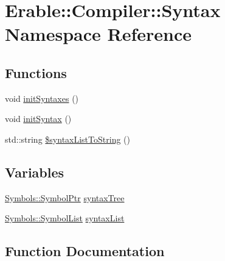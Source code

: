 \hypertarget{namespace_erable_1_1_compiler_1_1_syntax}{}\section{Erable\+::Compiler\+::Syntax Namespace Reference}
\label{namespace_erable_1_1_compiler_1_1_syntax}
\subsection*{Functions}
\begin{DoxyCompactItemize}
\item 
void \mbox{\hyperlink{namespace_erable_1_1_compiler_1_1_syntax_ab106bf5dfac4f663f37aab77e5469398}{init\+Syntaxes}} ()
\item 
void \mbox{\hyperlink{namespace_erable_1_1_compiler_1_1_syntax_a4dde89d8378cb3d9f82ca7f6e125956e}{init\+Syntax}} ()
\item 
std\+::string \mbox{\hyperlink{namespace_erable_1_1_compiler_1_1_syntax_abec7812cb8b7b694849799d3ff4cdd1f}{\$syntax\+List\+To\+String}} ()
\end{DoxyCompactItemize}
\subsection*{Variables}
\begin{DoxyCompactItemize}
\item 
\mbox{\hyperlink{namespace_erable_1_1_compiler_1_1_symbols_a8f0bc762f448ea4d84e8713ab3e140b9}{Symbols\+::\+Symbol\+Ptr}} \mbox{\hyperlink{namespace_erable_1_1_compiler_1_1_syntax_aecadb35dfe58c16e1f917013dd6bbb9d}{syntax\+Tree}}
\item 
\mbox{\hyperlink{namespace_erable_1_1_compiler_1_1_symbols_a63e8157d2f729d4689d27bacad42f8ed}{Symbols\+::\+Symbol\+List}} \mbox{\hyperlink{namespace_erable_1_1_compiler_1_1_syntax_ac522b8d488949688ca23a77252676ab7}{syntax\+List}}
\end{DoxyCompactItemize}


\subsection{Function Documentation}
\mbox{\label{namespace_erable_1_1_compiler_1_1_syntax_abec7812cb8b7b694849799d3ff4cdd1f}} 
